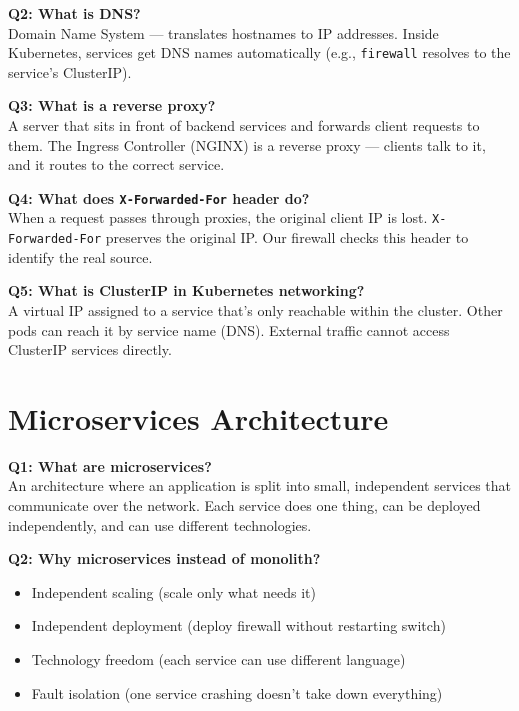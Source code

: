 \documentclass[12pt,a4paper]{article}
\begin{document}
\textbf{Q2: What is DNS?}\\
Domain Name System --- translates hostnames to IP addresses. Inside Kubernetes, services get DNS names automatically (e.g., \texttt{firewall} resolves to the service's ClusterIP).

\textbf{Q3: What is a reverse proxy?}\\
A server that sits in front of backend services and forwards client requests to them. The Ingress Controller (NGINX) is a reverse proxy --- clients talk to it, and it routes to the correct service.

\textbf{Q4: What does \texttt{X-Forwarded-For} header do?}\\
When a request passes through proxies, the original client IP is lost. \texttt{X-Forwarded-For} preserves the original IP. Our firewall checks this header to identify the real source.

\textbf{Q5: What is ClusterIP in Kubernetes networking?}\\
A virtual IP assigned to a service that's only reachable within the cluster. Other pods can reach it by service name (DNS). External traffic cannot access ClusterIP services directly.

\section{Microservices Architecture}

\textbf{Q1: What are microservices?}\\
An architecture where an application is split into small, independent services that communicate over the network. Each service does one thing, can be deployed independently, and can use different technologies.

\textbf{Q2: Why microservices instead of monolith?}
\begin{itemize}[noitemsep]
    \item Independent scaling (scale only what needs it)
    \item Independent deployment (deploy firewall without restarting switch)
    \item Technology freedom (each service can use different language)
    \item Fault isolation (one service crashing doesn't take down everything)
\end{itemize}
\end{document}
